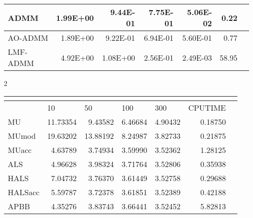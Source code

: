 \documentclass{article}
\begin{document}
\begin{table}[H]
\begin{tabular}{|l|r|r|r|r|r|l|}
		ADMM     & 1.99E+00                & 9.44E-01                & 7.75E-01                 & 5.06E-02                 & 0.22                         &  \\ \hline
		AO-ADMM  & 1.89E+00                & 9.22E-01                & 6.94E-01                 & 5.60E-01                 & 0.77                         &  \\ \hline
		LMF-ADMM & 4.92E+00                & 1.08E+00                & 2.56E-01                 & 2.49E-03                 & 58.95                        &  \\ \hline
	\end{tabular}
\end{table} 


2 
\begin{table}[H]
	\centering
	\begin{tabular}{|l|r|r|r|r|r|l|}
		\hline
		& \multicolumn{1}{l|}{}   & \multicolumn{1}{l|}{}   & \multicolumn{1}{l|}{}    & \multicolumn{1}{l|}{}    & \multicolumn{1}{l|}{}        &  \\ \hline
		& \multicolumn{1}{l|}{10} & \multicolumn{1}{l|}{50} & \multicolumn{1}{l|}{100} & \multicolumn{1}{l|}{300} & \multicolumn{1}{l|}{CPUTIME} &  \\ \hline
		MU       & 11.73354                & 9.43582                 & 6.46684                  & 4.90432                  & 0.18750                      &  \\ \hline
		MUmod    & 19.63202                & 13.88192                & 8.24987                  & 3.82733                  & 0.21875                      &  \\ \hline
		MUacc    & 4.63789                 & 3.74934                 & 3.59990                  & 3.52362                  & 1.28125                      &  \\ \hline
		ALS      & 4.96628                 & 3.98324                 & 3.71764                  & 3.52806                  & 0.35938                      &  \\ \hline
		HALS     & 7.04732                 & 3.76370                 & 3.61449                  & 3.52758                  & 0.29688                      &  \\ \hline
		HALSacc  & 5.59787                 & 3.72378                 & 3.61851                  & 3.52389                  & 0.42188                      &  \\ \hline
		APBB     & 4.35276                 & 3.83743                 & 3.66441                  & 3.52452                  & 5.82813                      &  \\ \hline

\end{tabular}
\end{table}
\end{document}
